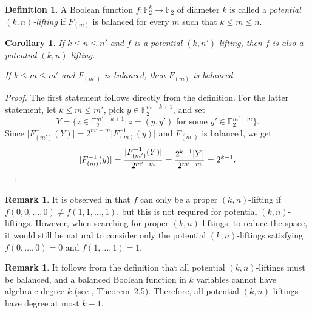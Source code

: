 \documentclass[11pt,english,a4paper]{amsart}
\theoremstyle{plain}
\newtheorem{corollary}[theorem]{Corollary}
\theoremstyle{definition}
\newtheorem{definition}[theorem]{Definition}
\newtheorem{remark}[theorem]{Remark}
\theoremstyle{remark}
\newcommand{\F}{\mathbb{F}}
\begin{document}
	\begin{definition}
		A Boolean function $f\colon\F_2^k\to\F_2$ of diameter $k$ is called a \emph{potential $(k,n)$-lifting} if $F_{(m)}$ is balanced for every $m$ such that $k\leq m\leq n$.
	\end{definition}
	
	\begin{corollary}
		If $k\leq n\leq n'$ and $f$ is a potential $(k,n')$-lifting, then $f$ is also a potential $(k,n)$-lifting.
		
		If $k\leq m\leq m'$ and $F_{(m')}$ is balanced, then $F_{(m)}$ is balanced.
	\end{corollary}
	
	\begin{proof}
		The first statement follows directly from the definition.
		For the latter statement, let $k\leq m\leq m'$, pick $y\in\F_2^{m-k+1}$, and set
		\[
		Y=\{ z\in\F_2^{m'-k+1} : z=(y,y') \text{ for some } y'\in\F_2^{m'-m} \}.
		\]
		Since $\lvert F_{(m')}^{-1}(Y)\rvert=2^{m'-m}\lvert F_{(m)}^{-1}(y)\rvert$ and $F_{(m')}$ is balanced, we get
		\[
		\lvert F_{(m)}^{-1}(y)\rvert=\frac{\lvert F_{(m')}^{-1}(Y)\rvert}{2^{m'-m}}=\frac{2^{k-1}\lvert Y\rvert}{2^{m'-m}}=2^{k-1}.\qedhere
		\]
	\end{proof}
	
	\begin{remark}
		It is observed in \cite{OS-iacr} that $f$ can only be a proper $(k, n)$-lifting if $f(0, 0, \dotsc , 0) \neq f(1, 1, \dotsc , 1)$, but this is not required for potential $(k, n)$-liftings. However, when searching for proper $(k, n)$-liftings, to reduce the space, it would still be natural to consider only the potential $(k, n)$-liftings satisfying $f(0, \dotsc , 0) = 0$ and $f(1, \dotsc , 1) = 1$.
	\end{remark}
	
	\begin{remark}
		It follows from the definition that all potential $(k,n)$-liftings must be balanced, and a balanced Boolean function in $k$ variables cannot have algebraic degree $k$ (see \cite{cusick}, Theorem~2.5). Therefore, all potential $(k,n)$-liftings have degree at most $k-1$.
  \end{remark}
\end{document}
